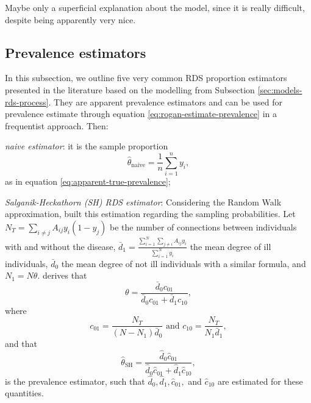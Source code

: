 Maybe only a superficial explanation about the model, since it is really
difficult, despite being apparently very nice. \cite{mclaughlin2021bayesian}

\subsection{Prevalence estimators}

In this subsection, we outline five very common RDS proportion estimators presented in the
literature based on the modelling from Subsection
\ref{sec:models-rds-process}. They are apparent prevalence estimators and can
be used for prevalence estimate through equation
\eqref{eq:rogan-estimate-prevalence} in a frequentist approach. Then:

\begin{alineas}
  \item {\em naive estimator}: it is the sample proportion 
  \begin{equation*}
    \hat{\theta}_{\mathrm{naive}} = \frac{1}{n}\sum_{i=1}^n y_i,
  \end{equation*} 
  as in equation \eqref{eq:apparent-true-prevalence}; 

  \item {\em Salganik-Heckathorn (SH) RDS
  estimator}: Considering the Random Walk
  approximation, \textcite{salganik2004sampling} built this estimation
  regarding the sampling probabilities. Let $N_T = \sum_{i \neq j} A_{ij}y_i(1-
  y_j)$ be the number of connections between individuals with and without the
  disease, $\bar{d}_1 = \frac{\sum_{i=1}^N \sum_{j \neq i}
  A_{ij}y_i}{\sum_{i=1}^N y_i}$ the mean degree of ill individuals,
  $\bar{d}_0$ the mean degree of not ill individuals with a similar formula,
  and $N_1 = N\theta$. \textcite[p. 218]{salganik2004sampling} derives that 
  \begin{equation*}
    \theta = \frac{\bar{d}_0 c_{01}}{\bar{d}_0 c_{01} + \bar{d}_1 c_{10}},
  \end{equation*}
  where 
  \begin{equation*}
    c_{01} = \frac{N_T}{(N - N_1)\bar{d}_0} \text{ and } c_{10} = \frac{N_T}{N_1\bar{d}_1},
  \end{equation*}
  and that 
  \begin{equation}
    \label{eq:salganik-estimator}
    \hat{\theta}_{\mathrm{SH}} = \frac{\widehat{d}_0 \hat{c}_{01}}{\widehat{d}_0 \hat{c}_{01} + \widehat{d}_1 \hat{c}_{10}},
  \end{equation}
  is the prevalence estimator, such that $\widehat{d}_0, \widehat{d}_1,
  \hat{c}_{01},$ and $\hat{c}_{10}$ are estimated for these quantities. 


\end{alineas}
